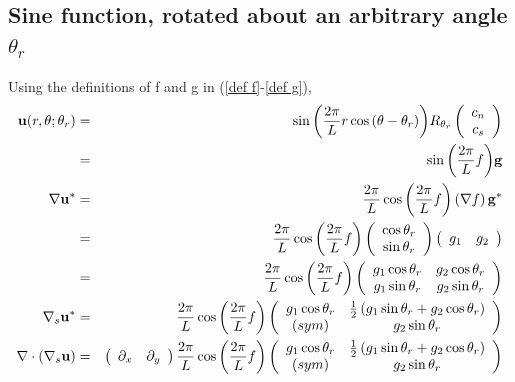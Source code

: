 \documentclass[11pt]{report}
\begin{document}
\subsection{Sine function, rotated about an arbitrary angle $\theta_r$\label{sine_rotation}}
Using the definitions of f and g in (\ref{def f}-\ref{def g}),
\begin{eqnarray}
{\bf u}(r,\theta;\theta_r) &=& \sin{\left(\frac{2\pi}{L}r\cos{(\theta-\theta_r)}\right)}
   R_{\theta_r} \left( \begin{array}{c} c_n \\ c_s \end{array}   \right) \\
&=& \sin{\left(\frac{2\pi}{L}f\right)}{\bf g} \\
\nabla{\bf u}^* &=& \frac{2\pi}{L}\cos{\left(\frac{2\pi}{L}f\right)}\left( \nabla f \right) {\bf g}^* \\
 &=& \frac{2\pi}{L}\cos{\left(\frac{2\pi}{L}f\right)}
\left( \begin{array}{c} \cos{\theta_r} \\ \sin{\theta_r} \end{array}    \right)  
\left(\begin{array}{cc} g_1 & g_2  \end{array} \right) \\
&=& \frac{2\pi}{L}\cos{\left(\frac{2\pi}{L}f\right)}
\left(\begin{array}{cc} g_1\cos{\theta_r} & g_2\cos{\theta_r} \\ g_1\sin{\theta_r} & g_2\sin{\theta_r}  \end{array} \right)\\
\nabla_s{\bf u}^* &=& \frac{2\pi}{L}\cos{\left(\frac{2\pi}{L}f\right)}
\left(\begin{array}{cc} g_1\cos{\theta_r} & \frac{1}{2}\left( g_1\sin{\theta_r} + g_2\cos{\theta_r} \right)\\
                      (sym) & g_2\sin{\theta_r}  \end{array} \right)\\
\nabla\cdot\left(\nabla_s{\bf u}\right) &=&  \left( \begin{array}{cc} \partial_x & \partial_y \end{array}   \right)
\frac{2\pi}{L}\cos{\left(\frac{2\pi}{L}f\right)}
\left(\begin{array}{cc} g_1\cos{\theta_r} & \frac{1}{2}\left( g_1\sin{\theta_r} + g_2\cos{\theta_r} \right)\\
                      (sym) & g_2\sin{\theta_r}  \end{array} \right)\\

\end{eqnarray}
\end{document}
